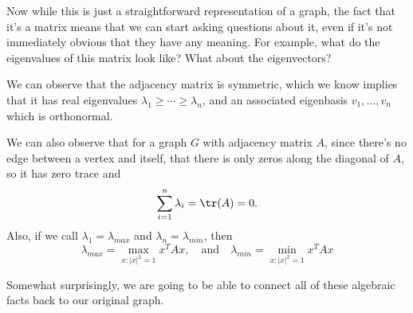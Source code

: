 \begin{example}
\begin{center}

	\end{center}
\end{example}

Now while this is just a straightforward representation of a graph, the fact that it's a matrix means that we can start asking questions about it, even if it's not immediately obvious that they have any meaning. For example, what do the eigenvalues of this matrix look like? What about the eigenvectors? 

We can observe that the adjacency matrix is symmetric, which we know implies that it has real eigenvalues $\lambda_1 \geq \cdots \geq \lambda_n$, and an associated eigenbasis $v_1, \dots, v_n$ which is orthonormal.

We can also observe that for a graph $G$ with adjacency matrix $A$, since there's no edge between a vertex and itself, that there is only zeros along the diagonal of $A$, so it has zero trace and
$$
\sum_{i = 1}^n \lambda_i = \tr(A) = 0.
$$
Also, if we call $\lambda_1 = \lambda_{max}$ and $\lambda_n = \lambda_{min}$, then
$$
\lambda_{max} = \max_{x : |x|^2 = 1} x^T A x, \quad \text{and} \quad \lambda_{min} = \min_{x : |x|^2 = 1} x^T A x
$$

Somewhat surprisingly, we are going to be able to connect all of these algebraic facts back to our original graph.


